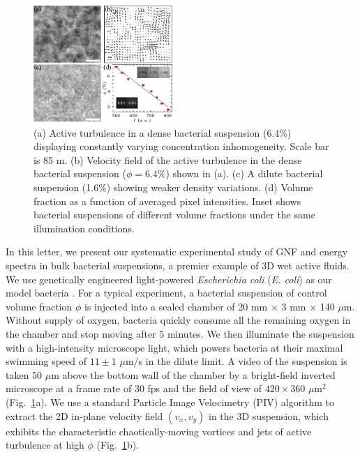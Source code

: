 \documentclass[twocolumn,aps,prl,amsmath,amssymb,longbibliography]{revtex4-2}
\begin{document}
\begin{figure}[ht]
\begin{center}
\includegraphics[width=0.47\textwidth]{Figures/experiment/v5.pdf}
\caption[Experimental details]
{
(a) Active turbulence in a dense bacterial suspension (6.4\%) displaying constantly varying concentration inhomogeneity. Scale bar is 85 \textmu m.
(b) Velocity field of the active turbulence in the dense bacterial suspension ($\phi=6.4\%$) shown in (a).
(c) A dilute bacterial suspension (1.6\%) showing weaker density variations.
(d) Volume fraction as a function of averaged pixel intensities. Inset shows bacterial suspensions of different volume fractions under the same illumination conditions.
}
\label{fig:experiment}
\end{center}
\end{figure}

In this letter, we present our systematic experimental study of GNF and energy spectra in bulk bacterial suspensions, a premier example of 3D wet active fluids. We use genetically engineered light-powered \textit{Escherichia coli} (\textit{E. coli}) as our model bacteria \cite{Liu2020}.
For a typical experiment, a bacterial suspension of control volume fraction $\phi$ is injected into a sealed chamber of 20 mm $\times$ 3 mm $\times$ 140 $\mu$m.
Without supply of oxygen, bacteria quickly consume all the remaining oxygen in the chamber and stop moving after $5$ minutes.
We then illuminate the suspension with a high-intensity microscope light, which powers bacteria at their maximal swimming speed of $11 \pm 1$ $\mu$m/s in the dilute limit.
A video of the suspension is taken 50 $\mu$m above the bottom wall of the chamber by a bright-field inverted microscope at a frame rate of $30$ fps and the field of view of $420 \times 360$ $\mu$m$^2$ (Fig.~\ref{fig:experiment}a).
We use a standard Particle Image Velocimetry (PIV) algorithm to extract the 2D in-plane velocity field $(v_x,v_y)$ in the 3D suspension, which exhibits the characteristic chaotically-moving vortices and jets of active turbulence at high $\phi$ (Fig.~\ref{fig:experiment}b).
\end{document}
